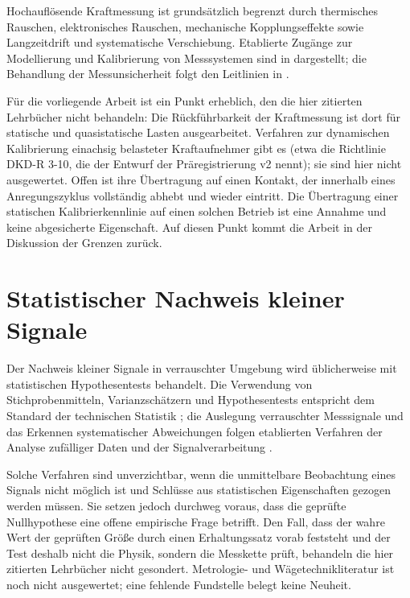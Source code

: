 \documentclass[12pt,a4paper]{report}
\begin{document}
Hochauflösende Kraftmessung ist grundsätzlich begrenzt durch thermisches
Rauschen, elektronisches Rauschen, mechanische Kopplungseffekte sowie
Langzeitdrift und systematische Verschiebung. Etablierte Zugänge zur
Modellierung und Kalibrierung von Messsystemen sind in
\cite{beckwith2006, doebelin2004, desilva2007} dargestellt; die
Behandlung der Messunsicherheit folgt den Leitlinien
in \cite{nist1994}.

Für die vorliegende Arbeit ist ein Punkt erheblich, den die hier
zitierten Lehrbücher nicht behandeln: Die Rückführbarkeit der
Kraftmessung ist dort für statische und quasistatische Lasten
ausgearbeitet. Verfahren zur dynamischen Kalibrierung einachsig
belasteter Kraftaufnehmer gibt es (etwa die Richtlinie DKD-R 3-10, die
der Entwurf der Präregistrierung v2 nennt); sie sind hier nicht
ausgewertet. Offen ist ihre Übertragung auf einen Kontakt, der innerhalb
eines Anregungszyklus vollständig abhebt und wieder eintritt. Die
Übertragung einer statischen Kalibrierkennlinie auf einen solchen Betrieb
ist eine Annahme und keine abgesicherte Eigenschaft. Auf diesen Punkt
kommt die Arbeit in der Diskussion der Grenzen zurück.

\section{Statistischer Nachweis kleiner Signale}

Der Nachweis kleiner Signale in verrauschter Umgebung wird üblicherweise
mit statistischen Hypothesentests behandelt. Die Verwendung von
Stichprobenmitteln, Varianzschätzern und Hypothesentests entspricht dem
Standard der technischen Statistik \cite{montgomery2014}; die Auslegung
verrauschter Messsignale und das Erkennen systematischer Abweichungen
folgen etablierten Verfahren der Analyse zufälliger Daten und der
Signalverarbeitung \cite{bendat2010, kay1998}.

Solche Verfahren sind unverzichtbar, wenn die unmittelbare Beobachtung
eines Signals nicht möglich ist und Schlüsse aus statistischen
Eigenschaften gezogen werden müssen. Sie setzen jedoch durchweg voraus,
dass die geprüfte Nullhypothese eine offene empirische Frage betrifft.
Den Fall, dass der wahre Wert der geprüften Größe durch einen
Erhaltungssatz vorab feststeht und der Test deshalb nicht die Physik,
sondern die Messkette prüft, behandeln die hier zitierten Lehrbücher
nicht gesondert. Metrologie- und Wägetechnikliteratur ist noch nicht
ausgewertet; eine fehlende Fundstelle belegt keine Neuheit.
\end{document}
